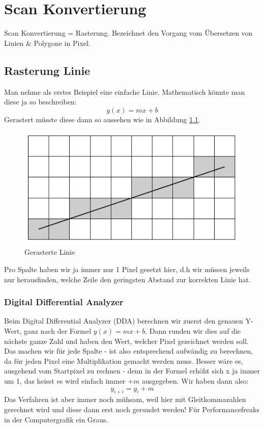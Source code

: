 \chapter{Scan Konvertierung}
Scan Konvertierung = Rasterung. Bezeichnet den Vorgang vom Übersetzen von Linien \& Polygone in Pixel.
\section{Rasterung Linie}
Man nehme als erstes Beispiel eine einfache Linie. Mathematisch könnte man diese ja so beschreiben:
\begin{displaymath}
y(x)=mx+b
\end{displaymath}
Gerastert müsste diese dann so aussehen wie in Abbildung \ref{fig:gerasterte_linie}.
\begin{figure}[!ht]
	\centering
	\includegraphics[width=0.4\linewidth]{fig/gerasterte_linie}
	\caption{Gerasterte Linie}
	\label{fig:gerasterte_linie}
\end{figure}
Pro Spalte haben wir ja immer nur 1 Pixel gesetzt hier, d.h wir müssen jeweils nur herausfinden, welche Zeile den geringsten Abstand zur korrekten Linie hat.



\subsection{Digital Differential Analyzer}
Beim Digital Differential Analyzer (DDA) berechnen wir zuerst den genauen Y-Wert, ganz nach der Formel \(y(x)=mx+b\). Dann runden wir dies auf die nächste ganze Zahl und haben den Wert, welcher Pixel gezeichnet werden soll. Das machen wir für jede Spalte - ist also entsprechend aufwändig zu berechnen, da für jeden Pixel eine Multiplikation gemacht werden muss. Besser wäre es, ausgehend vom Startpixel zu rechnen - denn in der Formel erhöht sich x ja immer um 1, das heisst es wird einfach immer \(+ m\) ausgegeben. Wir haben dann also:
\begin{displaymath}
y_{i+i}=y_i+m
\end{displaymath}
Das Verfahren ist aber immer noch mühsam, weil hier mit Gleitkommazahlen gerechnet wird und diese dann erst noch gerundet werden! Für Performancefreaks in der Computergrafik ein Graus.

